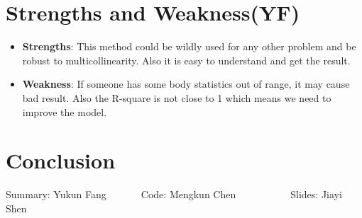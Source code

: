 \documentclass[12pt]{article}
\begin{document}
\vspace{-1.5em}
\section{\sffamily Strengths and Weakness(YF)}
\begin{itemize}
    \item \textbf{Strengths}: This method could be wildly used for any other problem and be robust to multicollinearity. Also it is easy to understand and 
    get the result.
    \item \textbf{Weakness}: If someone has some body statistics out of
    range, it may cause bad result. Also the R-square is not close to 1 which means 
    we need to improve the model.
\end{itemize}
\vspace{-1.5em}
\section{\sffamily Conclusion}
    \centerline{Summary: Yukun Fang~~~~~~~Code: Mengkun Chen~~~~~~~~~~~Slides: Jiayi Shen}
\end{document}
